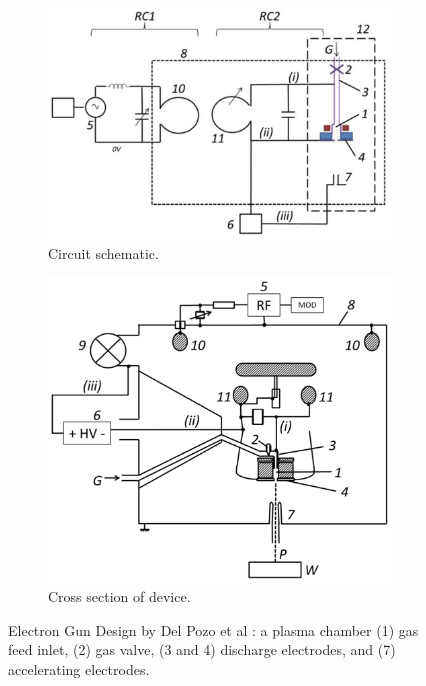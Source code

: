 \begin{figure}[h!]
	\centering
	\begin{subfigure}[b]{0.7\linewidth}
         \centering
         \includegraphics[width=\linewidth]{background/figures/del_pozo_device.png}
         \caption{Circuit schematic.}
     \end{subfigure}
     \begin{subfigure}[b]{0.7\linewidth}
         \centering
         \includegraphics[width=\linewidth]{background/figures/del_pozo_device_2.png}
         \caption{Cross section of device.}
     \end{subfigure}
	\caption{Electron Gun Design by Del Pozo et al \cite{Pozo2014}: 
	a plasma chamber (1) gas feed inlet, (2) gas valve, (3 and 4) discharge electrodes, and (7) accelerating electrodes.}
	\label{fig:del_pozo_device}
\end{figure}

